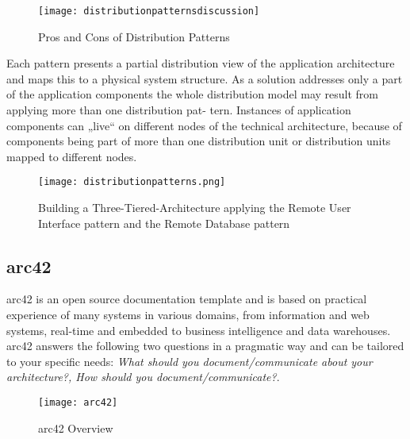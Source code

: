 \begin{figure}[H]
  \center
  \texttt{[image: distributionpatternsdiscussion]}
  \caption{Pros and Cons of Distribution Patterns}
  \label{fig:dpatternsdiscussion}
\end{figure}

Each pattern presents a partial distribution view of the application architecture and maps this to a physical system structure. As a solution addresses only a part of the application components the whole distribution model may result from applying more than one distribution pat- tern. Instances of application components can „live“ on different nodes of the technical architecture, because of components being part of more than one distribution unit or distribution units mapped to different nodes.

\begin{figure}[H]
  \center
  \texttt{[image: distributionpatterns.png]}
  \caption{Building a Three-Tiered-Architecture applying the Remote User Interface pattern and the Remote Database pattern}
\end{figure}

\subsection{arc42}
arc42 is an open source documentation template and is based on practical experience of many systems in various domains, from information and web systems, real-time and embedded to business intelligence and data warehouses. arc42 answers the following two questions in a pragmatic way and can be tailored to your specific needs: \textit{What should you document/communicate about your architecture?,  How should you document/communicate?}.

\begin{figure}[H]
  \center
  \texttt{[image: arc42]}
  \caption{arc42 Overview}
\end{figure}

